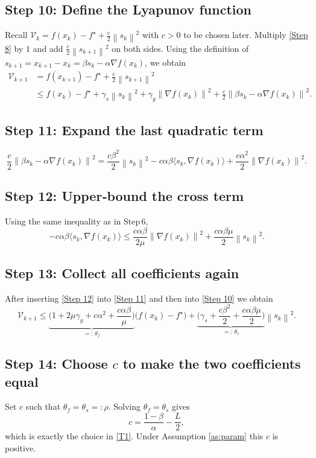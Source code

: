 \documentclass[11pt]{article}
\newcommand{\norm}[1]{\left\lVert#1\right\rVert}
\begin{document}
\subsection*{Step 10: Define the Lyapunov function}
Recall $\mathcal{V}_{k}=f(x_{k})-f^{\star}+\frac{c}{2}\norm{s_{k}}^{2}$ with $c>0$ to be chosen later.  Multiply \eqref{Step 8} by $1$ and add $\frac{c}{2}\norm{s_{k+1}}^{2}$ on both sides.  Using the definition of $s_{k+1}=x_{k+1}-x_{k}= \beta s_{k}-\alpha\nabla f(x_{k})$, we obtain
\[
\begin{aligned}
\mathcal{V}_{k+1}
&= f(x_{k+1})-f^{\star}
   +\frac{c}{2}\norm{s_{k+1}}^{2}\\[1mm]
&\le f(x_{k})-f^{\star}
   +\gamma_{s}\norm{s_{k}}^{2}
   +\gamma_{g}\norm{\nabla f(x_{k})}^{2}
   +\frac{c}{2}\norm{\beta s_{k}-\alpha\nabla f(x_{k})}^{2}.
\end{aligned}
\tag{Step 10}
\]

\subsection*{Step 11: Expand the last quadratic term}
\[
\frac{c}{2}\norm{\beta s_{k}-\alpha\nabla f(x_{k})}^{2}
= \frac{c\beta^{2}}{2}\norm{s_{k}}^{2}
  -c\alpha\beta\langle s_{k},\nabla f(x_{k})\rangle
  +\frac{c\alpha^{2}}{2}\norm{\nabla f(x_{k})}^{2}.
\tag{Step 11}
\]

\subsection*{Step 12: Upper‑bound the cross term}
Using the same inequality as in Step 6,
\[
- c\alpha\beta\langle s_{k},\nabla f(x_{k})\rangle
\le \frac{c\alpha\beta}{2\mu}\norm{\nabla f(x_{k})}^{2}
    +\frac{c\alpha\beta\mu}{2}\norm{s_{k}}^{2}.
\tag{Step 12}
\]

\subsection*{Step 13: Collect all coefficients again}
After inserting \eqref{Step 12} into \eqref{Step 11} and then into \eqref{Step 10} we obtain
\[
\mathcal{V}_{k+1}
\le \underbrace{\bigl(1+2\mu\gamma_{g}+c\alpha^{2}+\frac{c\alpha\beta}{\mu}\bigr)}_{=: \,\theta_{f}}\bigl(f(x_{k})-f^{\star}\bigr)
   +\underbrace{\bigl(\gamma_{s}+ \frac{c\beta^{2}}{2}+ \frac{c\alpha\beta\mu}{2}\bigr)}_{=: \,\theta_{s}}\norm{s_{k}}^{2}.
\tag{Step 13}
\]

\subsection*{Step 14: Choose $c$ to make the two coefficients equal}
Set $c$ such that $\theta_{f}=\theta_{s}=:\rho$.  Solving $\theta_{f}=\theta_{s}$ gives
\[
c=\frac{1-\beta}{\alpha}-\frac{L}{2},
\]
which is exactly the choice in \eqref{T1}.  Under Assumption \ref{as:param} this $c$ is positive.
\end{document}

